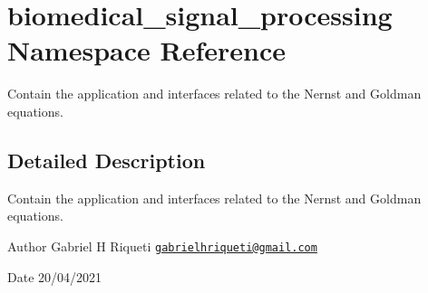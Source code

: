 \hypertarget{namespacebiomedical__signal__processing}{}\section{biomedical\+\_\+signal\+\_\+processing Namespace Reference}
\label{namespacebiomedical__signal__processing}


Contain the application and interfaces related to the Nernst and Goldman equations.  




\subsection{Detailed Description}
Contain the application and interfaces related to the Nernst and Goldman equations. 

\begin{DoxyAuthor}{Author}
Gabriel H Riqueti  \href{mailto:gabrielhriqueti@gmail.com}{\tt gabrielhriqueti@gmail.\+com} 
\end{DoxyAuthor}
\begin{DoxyDate}{Date}
20/04/2021 
\end{DoxyDate}
